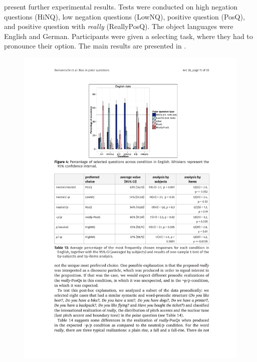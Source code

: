 \documentclass[output=paper,colorlinks,citecolor=brown]{langscibook}
\begin{document}
\citet{domaneschi2017bias} present further experimental results. Tests were conducted on high negation questions (HiNQ), low negation questions (LowNQ), positive question (PosQ), and positive question with \textit{really} (ReallyPosQ). The object languages were English and German. Participants were given a selecting task, where they had to pronounce their option. The main results are presented in . %

\begin{figure}
\includegraphics[height=.45\textheight]{figures/Domaneschi-1.pdf}

\end{figure}
\end{document}
